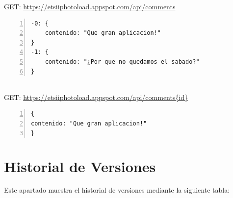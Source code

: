 \documentclass{scrartcl}
\begin{document}
GET: \href{https://etsiiphotoload.appspot.com/api/comments}{https://etsiiphotoload.appspot.com/api/comments}

\begin{lstlisting}[frame=lrtb,numbers=left]
-0: {
	contenido: "Que gran aplicacion!"
}
-1: {
	contenido: "¿Por que no quedamos el sabado?"
}

\end{lstlisting}

\\
GET: \href{https://etsiiphotoload.appspot.com/api/comments/0}{https://etsiiphotoload.appspot.com/api/comments\{id\}}

\begin{lstlisting}[frame=lrtb,numbers=left]
{
contenido: "Que gran aplicacion!"
}
\end{lstlisting}

\section{Historial de Versiones}
Este apartado muestra el historial de versiones mediante la siguiente tabla:
\\
\end{document}
